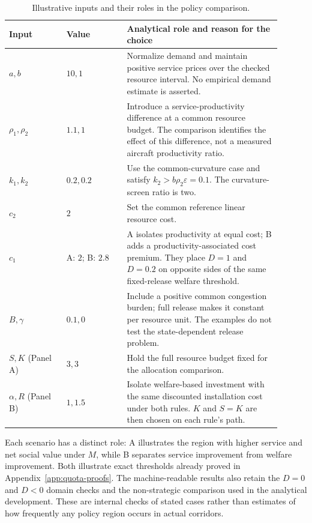 \begin{table}[htbp]
\centering\small
\caption{Illustrative inputs and their roles in the policy comparison.}\label{tab:current-scenario-inputs}
\begin{tabular}{P{0.19\linewidth}P{0.20\linewidth}P{0.51\linewidth}}
\toprule
Input & Value & Analytical role and reason for the choice\\
\midrule
$a,b$ & $10,1$ & Normalize demand and maintain positive service prices over the checked resource interval. No empirical demand estimate is asserted.\\
$\rho_1,\rho_2$ & $1.1,1$ & Introduce a service-productivity difference at a common resource budget. The comparison identifies the effect of this difference, not a measured aircraft productivity ratio.\\
$k_1,k_2$ & $0.2,0.2$ & Use the common-curvature case and satisfy $k_2>b\rho_2\varepsilon=0.1$. The curvature-screen ratio is two.\\
$c_2$ & $2$ & Set the common reference linear resource cost.\\
$c_1$ & A: $2$; B: $2.8$ & A isolates productivity at equal cost; B adds a productivity-associated cost premium. They place $D=1$ and $D=0.2$ on opposite sides of the same fixed-release welfare threshold.\\
$B,\gamma$ & $0.1,0$ & Include a positive common congestion burden; full release makes it constant per resource unit. The examples do not test the state-dependent release problem.\\
$S,K$ (Panel A) & $3,3$ & Hold the full resource budget fixed for the allocation comparison.\\
$\alpha,R$ (Panel B) & $1,1.5$ & Isolate welfare-based investment with the same discounted installation cost under both rules. $K$ and $S=K$ are then chosen on each rule's path.\\
\bottomrule
\end{tabular}
\end{table}

Each scenario has a distinct role: A illustrates the region with higher service and net social value under $M$, while B separates service improvement from welfare improvement. Both illustrate exact thresholds already proved in Appendix~\ref{app:quota-proofs}. The machine-readable results also retain the $D=0$ and $D<0$ domain checks and the non-strategic comparison used in the analytical development. These are internal checks of stated cases rather than estimates of how frequently any policy region occurs in actual corridors.

